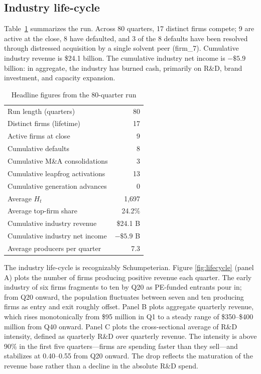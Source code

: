 \documentclass[11pt]{article}
\begin{document}
\subsection{Industry life-cycle}

Table~\ref{tab:headline} summarizes the run. Across 80 quarters, 17
distinct firms compete; 9 are active at the close, 8 have defaulted,
and 3 of the 8 defaults have been resolved through distressed
acquisition by a single solvent peer (firm\_7). Cumulative industry
revenue is \$24.1 billion. The cumulative industry net income is
$-\$5.9$ billion: in aggregate, the industry has burned cash, primarily
on R\&D, brand investment, and capacity expansion.

\begin{table}[t]\centering\small
\caption{Headline figures from the 80-quarter run}\label{tab:headline}
\begin{tabular}{lr}
\toprule
Run length (quarters) & 80 \\
Distinct firms (lifetime) & 17 \\
Active firms at close & 9 \\
Cumulative defaults & 8 \\
Cumulative M\&A consolidations & 3 \\
Cumulative leapfrog activations & 13 \\
Cumulative generation advances & 0 \\
Average $H_t$ & 1{,}697 \\
Average top-firm share & 24.2\% \\
Cumulative industry revenue & \$24.1 B \\
Cumulative industry net income & $-\$5.9$ B \\
Average producers per quarter & 7.3 \\
\bottomrule
\end{tabular}
\end{table}

The industry life-cycle is recognizably Schumpeterian. Figure
\ref{fig:lifecycle} (panel A) plots the number of firms producing
positive revenue each quarter. The early industry of six firms
fragments to ten by Q20 as PE-funded entrants pour in; from Q20 onward,
the population fluctuates between seven and ten producing firms as
entry and exit roughly offset. Panel B plots aggregate quarterly
revenue, which rises monotonically from \$95 million in Q1 to a steady
range of \$350--\$400 million from Q40 onward. Panel C plots the
cross-sectional average of R\&D intensity, defined as quarterly R\&D over
quarterly revenue. The intensity is above 90\% in the first five
quarters---firms are spending faster than they sell---and stabilizes at
0.40--0.55 from Q20 onward. The drop reflects the maturation of the
revenue base rather than a decline in the absolute R\&D spend.
\end{document}
